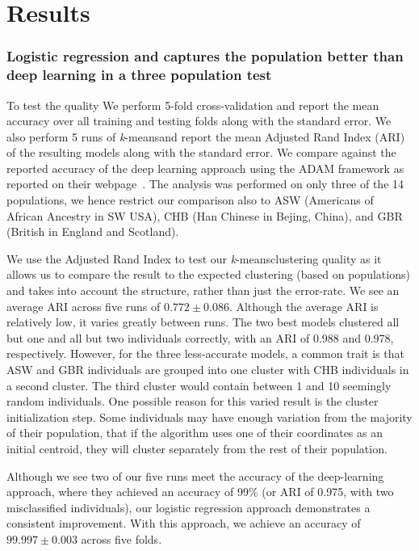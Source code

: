 \documentclass{llncs}
\newcommand{\kMeans}{\textit{k}-means}
\begin{document}
{%
\section{Results}
%
\subsubsection{Logistic regression and captures the population better than deep learning in a three population test}
To test the quality We perform 5-fold cross-validation and report the mean accuracy over all training and testing folds along with the standard error.
We also perform 5 runs of \kMeans and report the mean Adjusted Rand Index (ARI) of the resulting models along with the standard error. 
We compare against the reported accuracy of the deep learning approach using the ADAM framework as reported on their webpage~\cite{Ferguson}. 
The analysis was performed on only three of the 14 populations, we hence restrict our comparison also to ASW (Americans of African Ancestry in SW USA), CHB (Han Chinese in Bejing, China), and GBR (British in England and Scotland).

We use the Adjusted Rand Index to test our \kMeans clustering quality as it allows us to compare the result to the expected clustering (based on populations) and takes into account the structure, rather than just the error-rate. We see an average ARI across five runs of \(0.772 \pm 0.086 \).
Although the average ARI is relatively low, it varies greatly between runs. The two best models clustered all but one and all but two individuals correctly, with an ARI of 0.988 and 0.978, respectively.
However, for the three less-accurate models, a common trait is that ASW and GBR individuals are grouped into one cluster with CHB individuals in a second cluster. The third cluster would contain between 1 and 10 seemingly random individuals.
One possible reason for this varied result is the cluster initialization step. Some individuals may have enough variation from the majority of their population, that if the algorithm uses one of their coordinates as an initial centroid, they will cluster separately from the rest of their population.

Although we see two of our five runs meet the accuracy of the deep-learning approach, where they achieved an accuracy of 99\% (or ARI of 0.975, with two misclassified individuals), our logistic regression approach demonstrates a consistent improvement.
With this approach, we achieve an accuracy of \(99.997 \pm 0.003\) across five folds.

}
\end{document}
